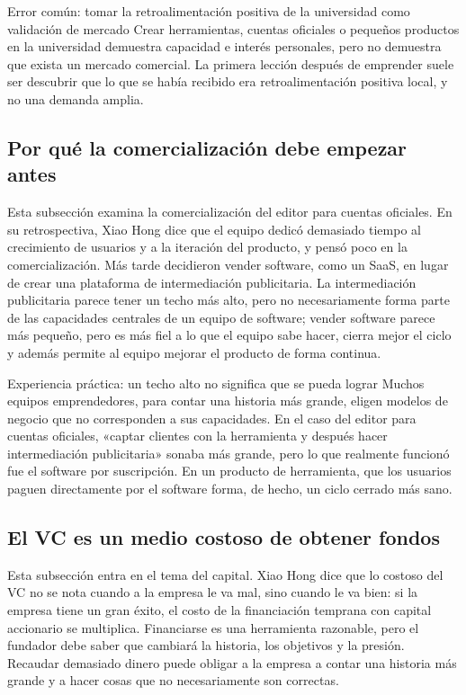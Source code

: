 \begin{warningbox}{Error común: tomar la retroalimentación positiva de la universidad como validación de mercado}
Crear herramientas, cuentas oficiales o pequeños productos en la universidad demuestra capacidad e interés personales, pero no demuestra que exista un mercado comercial. La primera lección después de emprender suele ser descubrir que lo que se había recibido era retroalimentación positiva local, y no una demanda amplia.
\end{warningbox}

\subsection{Por qué la comercialización debe empezar antes}

Esta subsección examina la comercialización del editor para cuentas oficiales. En su retrospectiva, Xiao Hong dice que el equipo dedicó demasiado tiempo al crecimiento de usuarios y a la iteración del producto, y pensó poco en la comercialización. Más tarde decidieron vender software, como un SaaS, en lugar de crear una plataforma de intermediación publicitaria. La intermediación publicitaria parece tener un techo más alto, pero no necesariamente forma parte de las capacidades centrales de un equipo de software; vender software parece más pequeño, pero es más fiel a lo que el equipo sabe hacer, cierra mejor el ciclo y además permite al equipo mejorar el producto de forma continua.

\begin{importantbox}{Experiencia práctica: un techo alto no significa que se pueda lograr}
Muchos equipos emprendedores, para contar una historia más grande, eligen modelos de negocio que no corresponden a sus capacidades. En el caso del editor para cuentas oficiales, «captar clientes con la herramienta y después hacer intermediación publicitaria» sonaba más grande, pero lo que realmente funcionó fue el software por suscripción. En un producto de herramienta, que los usuarios paguen directamente por el software forma, de hecho, un ciclo cerrado más sano.
\end{importantbox}

\subsection{El VC es un medio costoso de obtener fondos}

Esta subsección entra en el tema del capital. Xiao Hong dice que lo costoso del VC no se nota cuando a la empresa le va mal, sino cuando le va bien: si la empresa tiene un gran éxito, el costo de la financiación temprana con capital accionario se multiplica. Financiarse es una herramienta razonable, pero el fundador debe saber que cambiará la historia, los objetivos y la presión. Recaudar demasiado dinero puede obligar a la empresa a contar una historia más grande y a hacer cosas que no necesariamente son correctas.


